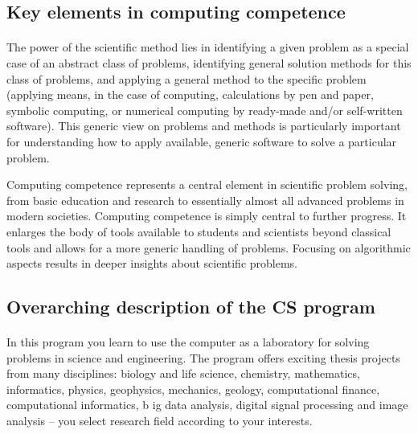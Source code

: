 \documentclass[%
oneside,                 %
final,                   %
10pt]{article}
\begin{document}
\noindent



\subsection*{Key elements in computing competence}

\paragraph{}
The power of the scientific method lies in identifying a given problem
as a special case of an abstract class of problems, identifying
general solution methods for this class of problems, and applying a
general method to the specific problem (applying means, in the case of
computing, calculations by pen and paper, symbolic computing, or
numerical computing by ready-made and/or self-written software). This
generic view on problems and methods is particularly important for
understanding how to apply available, generic software to solve a
particular problem.

Computing competence represents a central element
in scientific problem solving, from basic education and research to
essentially almost all advanced problems in modern
societies. Computing competence is simply central to further
progress. It enlarges the body of tools available to students and
scientists beyond classical tools and allows for a more generic
handling of problems. Focusing on algorithmic aspects results in
deeper insights about scientific problems.



\subsection*{Overarching description of the CS program}

\paragraph{}
In this program you learn to use the computer as a laboratory for
solving problems in science and engineering. The program offers
exciting thesis projects from many disciplines: biology and life
science, chemistry, mathematics, informatics, physics, geophysics,
mechanics, geology, computational finance, computational informatics, b
ig data analysis, digital signal processing
and image analysis – you select research field according to
your interests.
\end{document}
